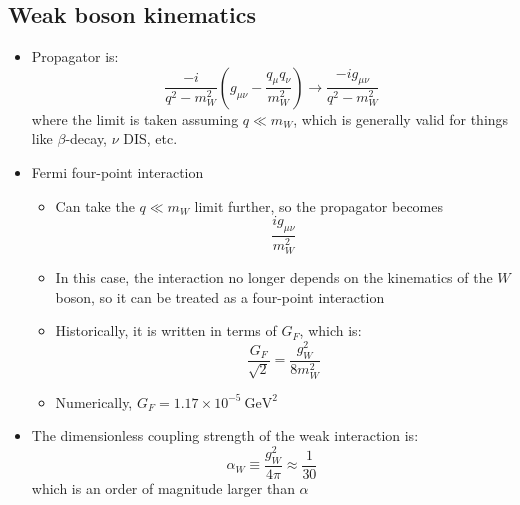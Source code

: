 \documentclass[11pt]{article}
\newcommand{\gev}{\text{GeV}}
\begin{document}
\subsection{Weak boson kinematics}
\begin{itemize}
  \item Propagator is:
  \begin{equation}
    \frac{-i}{q^2 - m_W^2} \left(g_{\mu\nu} - \frac{q_\mu q_\nu}{m_W^2}\right) \rightarrow \frac{-ig_{\mu\nu}}{q^2-m_W^2}
  \end{equation}
  where the limit is taken assuming $q \ll m_W$, which is generally valid for things like $\beta$-decay, $\nu$ DIS, etc.
  \item Fermi four-point interaction
  \begin{itemize}
      \item Can take the $q\ll m_W$ limit further, so the propagator becomes
      \begin{equation}
        \frac{i g_{\mu\nu}}{m_W^2} 
      \end{equation}
      \item In this case, the interaction no longer depends on the kinematics of the $W$ boson, so it can be treated as a four-point interaction
      \item Historically, it is written in terms of $G_F$, which is:
      \begin{equation}
        \frac{G_F}{\sqrt2} = \frac{g_W^2}{8 m_W^2}
      \end{equation}
      \item Numerically, $G_F = 1.17 \times 10^{-5}~\gev^2$
  \end{itemize}
  \item The dimensionless coupling strength of the weak interaction is:
  \begin{equation}
    \alpha_W \equiv \frac{g_W^2}{4\pi} \approx \frac{1}{30}
  \end{equation}
  which is an order of magnitude larger than $\alpha$
\end{itemize}
\end{document}
